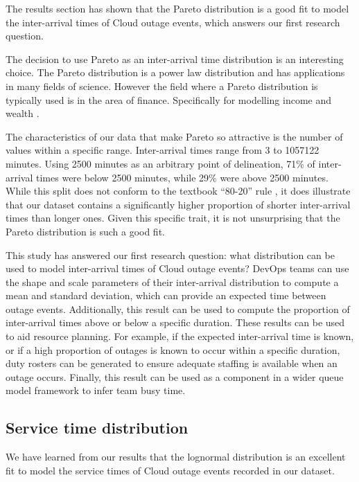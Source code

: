 \documentclass[5p]{elsarticle}
\begin{document}
The results section has shown that the Pareto distribution is a good fit to model the inter-arrival times of Cloud outage events, which answers our first research question.

The decision to use Pareto as an inter-arrival time distribution is an interesting choice. The Pareto distribution is a power law distribution and has applications in many fields of science. However the field where a Pareto distribution is typically used is in the area of finance. Specifically for modelling income and wealth \cite{arnold2015pareto}. 

The characteristics of our data that make Pareto so attractive is the number of values within a specific range. Inter-arrival times range from 3 to 1057122 minutes. Using 2500 minutes as an arbitrary point of delineation, 71\% of inter-arrival times were below 2500 minutes, while 29\% were above 2500 minutes. While this split does not conform to the textbook ``80-20'' rule \cite{chen1993theoretical}, it does illustrate that our dataset contains a significantly higher proportion of shorter inter-arrival times than longer ones. Given this specific trait, it is not unsurprising that the Pareto distribution is such a good fit. 

This study has answered our first research question: what distribution can be used to model inter-arrival times of Cloud outage events? DevOps teams can use the shape and scale parameters of their inter-arrival distribution to compute a mean and standard deviation, which can provide an expected time between outage events. Additionally, this result can be used to compute the proportion of inter-arrival times above or below a specific duration. These results can be used to aid resource planning. For example, if the expected inter-arrival time is known, or if a high proportion of outages is known to occur within a specific duration, duty rosters can be generated to ensure adequate staffing is available when an outage occurs. Finally, this result can be used as a component in a wider queue model framework to infer team busy time.

\subsection{Service time distribution}

We have learned from our results that the lognormal distribution is an excellent fit to model the service times of Cloud outage events recorded in our dataset. 
\end{document}
